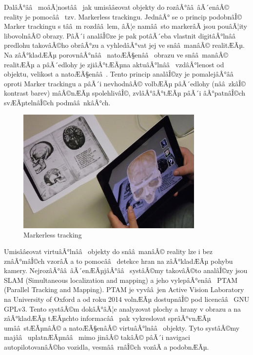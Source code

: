 \documentclass[twoside,12pt]{article}
\begin{document}
DalâÂ°ââ  moâÃ¦nostââ  jak umisââ¢ovat objekty do rozâÂ°ââ âÃ´enâÂ© reality je pomocââ  tzv. Markerless trackingu. JednâÂ° se o princip podobnâÎ© Marker trackingu s tââ m rozdââ lem, âÃ¦e namââ sto markerâÃ jsou pouâÃ¦ity libovolnâÂ© obrazy. PâÃ´i analâÎ©ze je pak potâÃ´eba vlastnit digitâÂ°lnââ  predlohu takovâÂ©ho obrâÂ°zu a vyhledâÂ°vat jej ve snââ manâÂ© realitÆÃµ. Na zâÂ°kladÆÃµ porovnâÂ°nââ  natoÆÃ§enââ  obrazu ve snââ manâÂ© realitÆÃµ a pâÃ´edlohy je zjiâÂ°tÆÃµna aktuâÂ°lnââ  vzdâÂ°lenost od objektu, velikost a natoÆÃ§enââ . Tento princip analâÎ©zy je pomalejâÂ°ââ  oproti Marker trackingu a pâÃ´i nevhodnâÂ© volbÆÃµ pâÃ´edlohy (nââ zkâÎ© kontrast barev) mâÂ©nÆÃµ spolehlivâÎ©, zvlâÂ°âÂ°tÆÃµ pâÃ´i âÂ°patnâÎ©ch svÆÃµtelnâÎ©ch podmââ nkâÂ°ch.

\begin{figure}[H]
    \includegraphics[width=350px, center]{images/markerless-tracking.jpg}
    \caption{Markerless tracking}
    \label{markerless_tracking}
\end{figure}

Umisââ¢ovat virtuâÂ°lnââ  objekty do snââ manâÂ© reality lze i bez znâÂ°mâÎ©ch vzorâÃ a to pomocââ  detekce hran na zâÂ°kladÆÃµ pohybu kamery. NejrozâÂ°ââ âÃ´enÆÃµjâÂ°ââ  systâÂ©my takovâÂ©to analâÎ©zy jsou SLAM (Simultaneous localization and mapping) a jeho vylepâÂ°enââ  PTAM (Parallel Tracking and Mapping). PTAM je vyvââ jen Active Vision Laboratory na University of Oxford a od roku 2014 volnÆÃµ dostupnâÎ© pod licencââ  GNU GPLv3. Tento systâÂ©m dokâÂ°âÃ¦e analyzovat plochy a hrany v obrazu a na zâÂ°kladÆÃµ tÆÃµchto informacââ  pak vykreslovat sprâÂ°vnÆÃµ umââ stÆÃµnâÂ© a natoÆÃ§enâÂ© virtuâÂ°lnââ  objekty. Tyto systâÂ©my majââ  uplatnÆÃµnââ  mimo jinâÂ© takâÂ© pâÃ´i navigaci autopilotovanâÂ©ho vozidla, vesmââ rnâÎ©ch vozâÃ a podobnÆÃµ.
\end{document}
